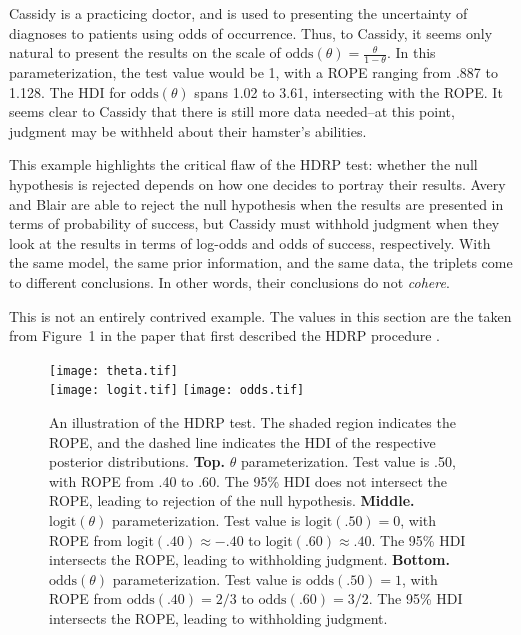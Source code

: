 \documentclass[man]{apa}
\newcommand{\hdr}{HDRP}
\newcommand{\oddss}{\text{odds}}
\newcommand{\logit}{\text{logit}}
\begin{document}
Cassidy is a practicing doctor, and is used to presenting the uncertainty of diagnoses to patients using odds of occurrence. Thus, to Cassidy, it seems only natural to present the results on the scale of $\oddss(\theta)=\frac{\theta}{1-\theta}$. In this parameterization, the test value would be 1, with a ROPE ranging from .887 to 1.128. The HDI for $\oddss(\theta)$ spans 1.02 to 3.61, intersecting with the ROPE.%
It seems clear to Cassidy that there is still more data needed--at this point, judgment may  be withheld about their hamster's abilities. %

This example highlights the critical flaw of the \hdr{} test: whether the null hypothesis is rejected depends on how one decides to portray their results. Avery and Blair are able to reject the null hypothesis when the results are presented in terms of probability of success, but Cassidy must withhold judgment when they look at the results in terms of log-odds and odds of success, respectively. With the same model, the same prior information, and the same data, the triplets come to different conclusions. In other words, their conclusions do not \textit{cohere}. 

This is not an entirely contrived example.  The values in this section are the taken from Figure~1 in the paper that first described the \hdr{} procedure \cite{Kruschke2011}.




\begin{figure}[!!h]
    \centering
    \texttt{[image: theta.tif]}\\
    \texttt{[image: logit.tif]}
    \texttt{[image: odds.tif]}
    \caption{An illustration of the \hdr{} test. The shaded region indicates the ROPE, and the dashed line indicates the HDI of the respective posterior distributions. \textbf{Top.} $\theta$ parameterization. Test value is .50, with ROPE from .40 to .60. The 95\% HDI does not intersect the ROPE, leading to rejection of the null hypothesis. \textbf{Middle.} $\logit(\theta)$ parameterization. Test value is $\logit(.50)=0$, with ROPE from $\logit(.40)\approx-.40$ to $\logit(.60)\approx.40$. The 95\% HDI intersects the ROPE, leading to withholding judgment. \textbf{Bottom.} $\oddss(\theta)$ parameterization. Test value is $\oddss(.50)=1$, with ROPE from $\oddss(.40)=2/3$ to $\oddss(.60)=3/2$. The 95\% HDI intersects the ROPE, leading to withholding judgment.}
    \label{fig:ropes}
\end{figure}
\end{document}
